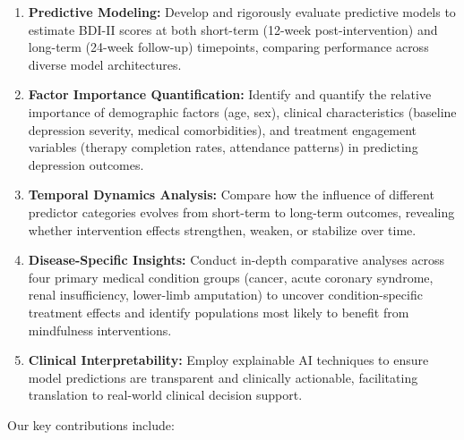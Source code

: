 \documentclass[conference]{IEEEtran}
\begin{document}
\begin{enumerate}
    \item \textbf{Predictive Modeling:} Develop and rigorously evaluate predictive models to estimate BDI-II scores at both short-term (12-week post-intervention) and long-term (24-week follow-up) timepoints, comparing performance across diverse model architectures.
    
    \item \textbf{Factor Importance Quantification:} Identify and quantify the relative importance of demographic factors (age, sex), clinical characteristics (baseline depression severity, medical comorbidities), and treatment engagement variables (therapy completion rates, attendance patterns) in predicting depression outcomes.
    
    \item \textbf{Temporal Dynamics Analysis:} Compare how the influence of different predictor categories evolves from short-term to long-term outcomes, revealing whether intervention effects strengthen, weaken, or stabilize over time.
    
    \item \textbf{Disease-Specific Insights:} Conduct in-depth comparative analyses across four primary medical condition groups (cancer, acute coronary syndrome, renal insufficiency, lower-limb amputation) to uncover condition-specific treatment effects and identify populations most likely to benefit from mindfulness interventions.
    
    \item \textbf{Clinical Interpretability:} Employ explainable AI techniques to ensure model predictions are transparent and clinically actionable, facilitating translation to real-world clinical decision support.
\end{enumerate}

Our key contributions include:
\end{document}
